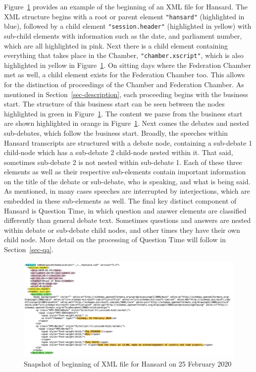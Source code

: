 \documentclass[
  letterpaper,
  DIV=11,
  numbers=noendperiod]{scrartcl}
\begin{document}
Figure~\ref{fig-xml1} provides an example of the beginning of an XML
file for Hansard. The XML structure begins with a root or parent element
\texttt{"hansard"} (highlighted in blue), followed by a child element
\texttt{"session.header"} (highlighted in yellow) with sub-child
elements with information such as the date, and parliament number, which
are all highlighted in pink. Next there is a child element containing
everything that takes place in the Chamber, \texttt{"chamber.xscript"},
which is also highlighted in yellow in Figure~\ref{fig-xml1}. On sitting
days where the Federation Chamber met as well, a child element exists
for the Federation Chamber too. This allows for the distinction of
proceedings of the Chamber and Federation Chamber. As mentioned in
Section~\ref{sec-description}, each proceeding begins with the business
start. The structure of this business start can be seen between the
nodes highlighted in green in Figure~\ref{fig-xml1}. The content we
parse from the business start are shown highlighted in orange in
Figure~\ref{fig-xml1}. Next comes the debates and nested sub-debates,
which follow the business start. Broadly, the speeches within Hansard
transcripts are structured with a debate node, containing a sub-debate 1
child-node which has a sub-debate 2 child-node nested within it. That
said, sometimes sub-debate 2 is not nested within sub-debate 1. Each of
these three elements as well as their respective sub-elements contain
important information on the title of the debate or sub-debate, who is
speaking, and what is being said. As mentioned, in many cases speeches
are interrupted by interjections, which are embedded in these
sub-elements as well. The final key distinct component of Hansard is
Question Time, in which question and answer elements are classified
differently than general debate text. Sometimes questions and answers
are nested within debate or sub-debate child nodes, and other times they
have their own child node. More detail on the processing of Question
Time will follow in Section~\ref{sec-qa}.

\begin{figure}

{\centering \includegraphics{xml1.png}

}

\caption{\label{fig-xml1}Snapshot of beginning of XML file for Hansard
on 25 February 2020}

\end{figure}
\end{document}

